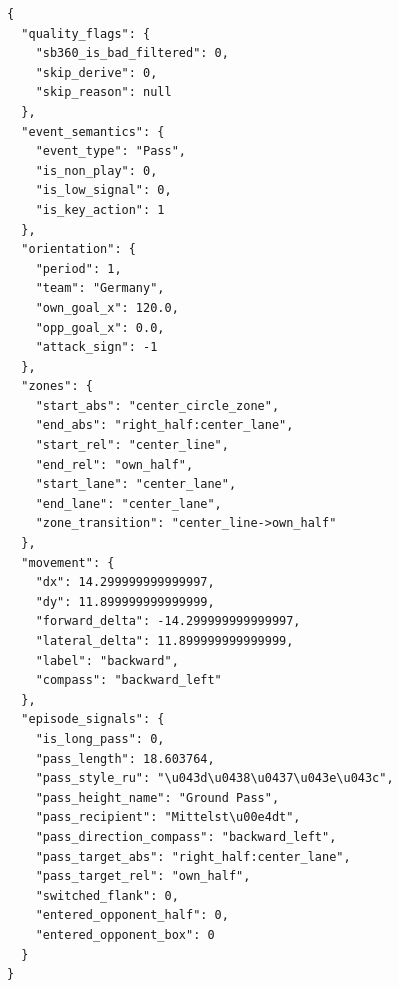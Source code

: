 \begin{lstlisting}[caption={Добавленные производные признаки для события},label={lst:derived-event-example}]
{
  "quality_flags": {
    "sb360_is_bad_filtered": 0,
    "skip_derive": 0,
    "skip_reason": null
  },
  "event_semantics": {
    "event_type": "Pass",
    "is_non_play": 0,
    "is_low_signal": 0,
    "is_key_action": 1
  },
  "orientation": {
    "period": 1,
    "team": "Germany",
    "own_goal_x": 120.0,
    "opp_goal_x": 0.0,
    "attack_sign": -1
  },
  "zones": {
    "start_abs": "center_circle_zone",
    "end_abs": "right_half:center_lane",
    "start_rel": "center_line",
    "end_rel": "own_half",
    "start_lane": "center_lane",
    "end_lane": "center_lane",
    "zone_transition": "center_line->own_half"
  },
  "movement": {
    "dx": 14.299999999999997,
    "dy": 11.899999999999999,
    "forward_delta": -14.299999999999997,
    "lateral_delta": 11.899999999999999,
    "label": "backward",
    "compass": "backward_left"
  },
  "episode_signals": {
    "is_long_pass": 0,
    "pass_length": 18.603764,
    "pass_style_ru": "\u043d\u0438\u0437\u043e\u043c",
    "pass_height_name": "Ground Pass",
    "pass_recipient": "Mittelst\u00e4dt",
    "pass_direction_compass": "backward_left",
    "pass_target_abs": "right_half:center_lane",
    "pass_target_rel": "own_half",
    "switched_flank": 0,
    "entered_opponent_half": 0,
    "entered_opponent_box": 0
  }
}
\end{lstlisting}

